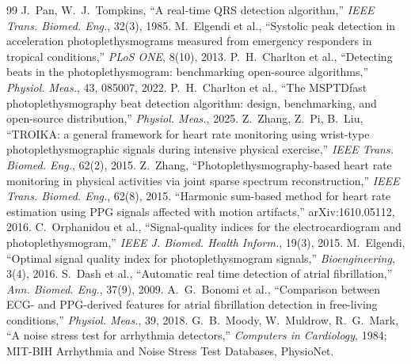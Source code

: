 \documentclass[10pt,a4paper]{article}
\begin{document}
\begin{thebibliography}{99}\small
{} J.~Pan, W.~J.~Tompkins, ``A real-time QRS detection algorithm,'' \emph{IEEE Trans. Biomed. Eng.}, 32(3), 1985.
 M.~Elgendi et al., ``Systolic peak detection in acceleration photoplethysmograms measured from emergency responders in tropical conditions,'' \emph{PLoS ONE}, 8(10), 2013.
 P.~H.~Charlton et al., ``Detecting beats in the photoplethysmogram: benchmarking open-source algorithms,'' \emph{Physiol. Meas.}, 43, 085007, 2022.
 P.~H.~Charlton et al., ``The MSPTDfast photoplethysmography beat detection algorithm: design, benchmarking, and open-source distribution,'' \emph{Physiol. Meas.}, 2025.
 Z.~Zhang, Z.~Pi, B.~Liu, ``TROIKA: a general framework for heart rate monitoring using wrist-type photoplethysmographic signals during intensive physical exercise,'' \emph{IEEE Trans. Biomed. Eng.}, 62(2), 2015.
 Z.~Zhang, ``Photoplethysmography-based heart rate monitoring in physical activities via joint sparse spectrum reconstruction,'' \emph{IEEE Trans. Biomed. Eng.}, 62(8), 2015.
 ``Harmonic sum-based method for heart rate estimation using PPG signals affected with motion artifacts,'' arXiv:1610.05112, 2016.
 C.~Orphanidou et al., ``Signal-quality indices for the electrocardiogram and photoplethysmogram,'' \emph{IEEE J. Biomed. Health Inform.}, 19(3), 2015.
 M.~Elgendi, ``Optimal signal quality index for photoplethysmogram signals,'' \emph{Bioengineering}, 3(4), 2016.
 S.~Dash et al., ``Automatic real time detection of atrial fibrillation,'' \emph{Ann. Biomed. Eng.}, 37(9), 2009.
 A.~G.~Bonomi et al., ``Comparison between ECG- and PPG-derived features for atrial fibrillation detection in free-living conditions,'' \emph{Physiol. Meas.}, 39, 2018.
 G.~B.~Moody, W.~Muldrow, R.~G.~Mark, ``A noise stress test for arrhythmia detectors,'' \emph{Computers in Cardiology}, 1984; MIT-BIH Arrhythmia and Noise Stress Test Databases, PhysioNet.
\end{thebibliography}
\end{document}
